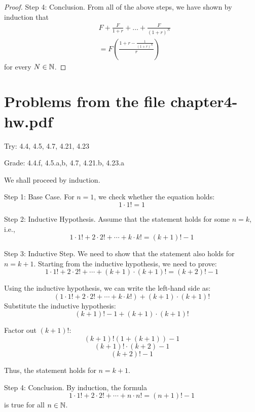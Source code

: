 \documentclass[12pt]{amsart}
\begin{document}
\begin{problem}
\begin{proof}
	Step 4: Conclusion. From all of the above steps, we have shown by induction that
	\begin{align*}
		 & F + \frac{F}{1 + r} + \dots + \frac{F}{(1 + r)^N}         \\
		 & = F \left(\frac{ 1 + r - \frac{1}{(1+r)^{N}} }{r} \right)
	\end{align*}
	for every $N \in \mathbb{N}$.
\end{proof}

\end{problem}

\section*{Problems from the file chapter4-hw.pdf}

Try: 4.4, 4.5, 4.7, 4.21, 4.23

Grade: 4.4.f, 4.5.a,b, 4.7, 4.21.b, 4.23.a

\begin{problem}[4.4.f]
We shall proceed by induction.

Step 1: Base Case.
For \( n = 1 \), we check whether the equation holds:
\[
	1 \cdot 1! = 1
\]

Step 2: Inductive Hypothesis.
Assume that the statement holds for some \( n = k \), i.e.,
\[
	1 \cdot 1! + 2 \cdot 2! + \cdots + k \cdot k! = (k+1)! - 1
\]

Step 3: Inductive Step.
We need to show that the statement also holds for \( n = k + 1 \). Starting from the inductive hypothesis, we need to prove:
\[
	1 \cdot 1! + 2 \cdot 2! + \cdots + (k+1) \cdot (k+1)! = (k+2)! - 1
\]

Using the inductive hypothesis, we can write the left-hand side as:
\[
	\left(1 \cdot 1! + 2 \cdot 2! + \cdots + k \cdot k!\right) + (k+1) \cdot (k+1)!
\]
Substitute the inductive hypothesis:
\[
	(k+1)! - 1 + (k+1) \cdot (k+1)!
\]

Factor out \( (k+1)! \):
\[
	(k+1)! \left(1 + (k+1)\right) - 1
\]
\[
	(k+1)! \cdot (k+2) - 1
\]
\[
	(k+2)! - 1
\]

Thus, the statement holds for \( n = k+1 \).

Step 4: Conclusion.
By induction, the formula
\[
	1 \cdot 1! + 2 \cdot 2! + \cdots + n \cdot n! = (n+1)! - 1
\]
is true for all \( n \in \mathbb{N} \).
\end{problem}
\end{document}
